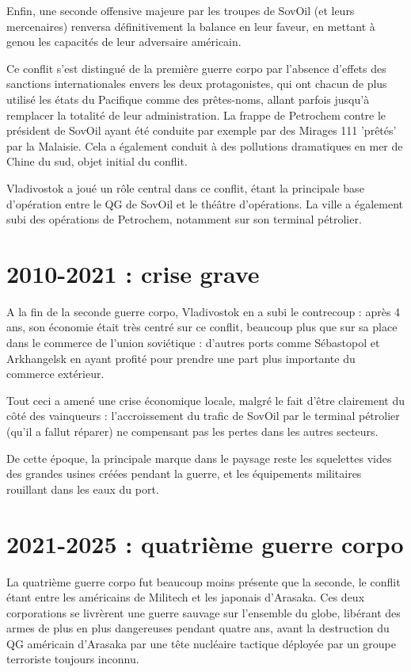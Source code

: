 \documentclass[10pt,a4paper]{book}
\begin{document}
Enfin, une seconde offensive majeure par les troupes de SovOil (et leurs mercenaires) renversa définitivement la balance en leur faveur, en mettant à genou les capacités de leur adversaire américain.

Ce conflit s'est distingué de la première guerre corpo par l'absence d'effets des sanctions internationales envers les deux protagonistes, qui ont chacun de plus utilisé les états du Pacifique comme des prêtes-noms, allant parfois jusqu'à remplacer la totalité de leur administration. La frappe de Petrochem contre le président de SovOil ayant été conduite par exemple par des Mirages 111 'prêtés' par la Malaisie. Cela a également conduit à des pollutions dramatiques en mer de Chine du sud, objet initial du conflit.

Vladivostok a joué un rôle central dans ce conflit, étant la principale base d'opération entre le QG de SovOil et le théâtre d'opérations. La ville a également subi des opérations de Petrochem, notamment sur son terminal pétrolier.
\section{2010-2021 : crise grave}
A la fin de la seconde guerre corpo, Vladivostok en a subi le contrecoup : après 4 ans, son économie était très centré sur ce conflit, beaucoup plus que sur sa place dans le commerce de l'union soviétique : d'autres ports comme Sébastopol et Arkhangelsk en ayant profité pour prendre une part plus importante du commerce extérieur.

Tout ceci a amené une crise économique locale, malgré le fait d'être clairement du côté des vainqueurs : l'accroissement du trafic de SovOil par le terminal pétrolier (qu'il a fallut réparer) ne compensant pas les pertes dans les autres secteurs.

De cette époque, la principale marque dans le paysage reste les squelettes vides des grandes usines créées pendant la guerre, et les équipements militaires rouillant dans les eaux du port.

\section{2021-2025 : quatrième guerre corpo}
La quatrième guerre corpo fut beaucoup moins présente que la seconde, le conflit étant entre les américains de Militech et les japonais d'Arasaka. Ces deux corporations se livrèrent une guerre sauvage sur l'ensemble du globe, libérant des armes de plus en plus dangereuses pendant quatre ans, avant la destruction du QG américain d'Arasaka par une tête nucléaire tactique déployée par un groupe terroriste toujours inconnu.
\end{document}
